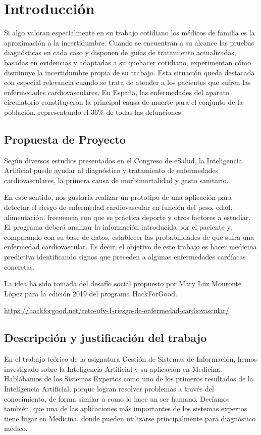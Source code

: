 \chapter {Introducción}
\label{cap:Introduccion}

Si algo valoran especialmente en su trabajo cotidiano los médicos de familia es la aproximación a la incertidumbre. Cuando se encuentran a su alcance las pruebas diagnósticas en cada caso y disponen de guías de tratamiento actualizadas, basadas en evidencias y adaptadas a su quehacer cotidiano, experimentan cómo disminuye la incertidumbre propia de su trabajo. 
Esta situación queda destacada con especial relevancia cuando se trata de atender a los pacientes que sufren las enfermedades cardiovasculares. En España, las enfermedades del aparato circulatorio constituyeron la principal causa de muerte para el conjunto de la población, representando el 36\% de todas las defunciones. 

\section{Propuesta de Proyecto}
Según diversos estudios presentados en el Congreso de eSalud, la Inteligencia Artificial puede
ayudar al diagnóstico y tratamiento de enfermedades cardiovasculares, la primera causa de
morbimortalidad y gasto sanitario.

En este sentido, nos gustaría realizar un prototipo de una aplicación para detectar el riesgo de
enfermedad cardiovascular en función del peso, edad, alimentación, frecuencia con que se
práctica deporte y otros factores a estudiar. El programa deberá analizar la información
introducida por el paciente y, comparando con su base de datos, establecer las probabilidades de
que sufra una enfermedad cardiovascular. Es decir, el objetivo de este trabajo es hacer medicina
predictiva identificando signos que preceden a algunas enfermedades cardíacas concretas.

La idea ha sido tomada del desafío social propuesto por Mary Luz Mouronte López para la edición
2019 del programa HackForGood.
\begin{center}
\url{https://hackforgood.net/reto-ufv-1-riesgo-de-enfermedad-cardiovascular/}
\end{center}


\section{Descripción y justificación del trabajo}
En el trabajo teórico de la asignatura Gestión de Sistemas de Información, hemos investigado sobre la Inteligencia Artificial y su aplicación en Medicina. Hablábamos de los Sistemas Expertos como uno de los primeros resultados de la Inteligencia Artificial, porque logran resolver problemas a través del conocimiento, de forma similar a como lo hace un ser humano. Decíamos también, que una de las aplicaciones más importantes de los sistemas expertos tiene lugar en Medicina, donde pueden utilizarse principalmente para diagnóstico médico.

